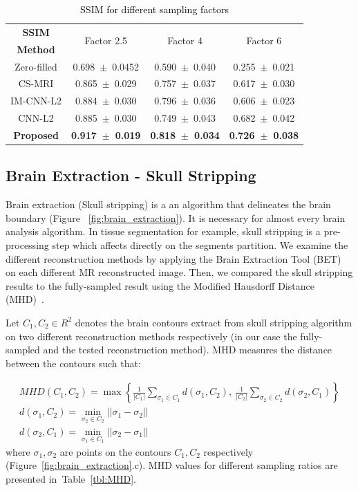 \documentclass[review]{elsarticle}
\begin{document}
\begin{table}[H]
	\centering{}
	\begin{tabular}{|c||c||c||c|}
		\hline 
		\textbf{SSIM} & \multicolumn{1}{c||}{\multirow{2}{*}{Factor 2.5}} & \multicolumn{1}{c||}{\multirow{2}{*}{Factor 4}} & \multicolumn{1}{c|}{\multirow{2}{*}{Factor 6}} \tabularnewline
		\textbf{Method} & \multicolumn{1}{c||}{} & \multicolumn{1}{c||}{} & \multicolumn{1}{c|}{} \tabularnewline \cline{1-4}
		
		Zero-filled         &0.698~$\pm$~0.0452  &0.590~$\pm$~0.040   &0.255~$\pm$~0.021\tabularnewline
		CS-MRI              &0.865~$\pm$~0.029  &0.757~$\pm$~0.037   &0.617~$\pm$~0.030\tabularnewline
		IM-CNN-L2           &0.884~$\pm$~0.030  &0.796~$\pm$~0.036   &0.606~$\pm$~0.023\tabularnewline
		CNN-L2              &0.885~$\pm$~0.030  &0.749~$\pm$~0.043   &0.682~$\pm$~0.042\tabularnewline
		\textbf{Proposed}   &\textbf{0.917~$\pm$~0.019}  &\textbf{0.818~$\pm$~0.034}   &\textbf{0.726~$\pm$~0.038}\tabularnewline
		\hline 
	\end{tabular}\caption{\textcolor{black}{\footnotesize{}{}SSIM for different sampling factors}{\footnotesize{}\label{tbl:SSIM_NO_MASK}}}
\end{table}


\subsection{Brain Extraction - Skull Stripping}
Brain extraction (Skull stripping) is a an algorithm that delineates the brain boundary (Figure~ \ref{fig:brain_extraction}). It is necessary for almost every brain analysis algorithm. In tissue segmentation for example, skull stripping is a pre-processing step which affects directly on the segments partition. We examine the different reconstruction methods by applying the Brain Extraction Tool (BET) \cite{smith2002fast} on each different MR reconstructed image. Then, we compared the skull stripping results to the fully-sampled result using the Modified Hausdorff Distance (MHD)~\cite{dubuisson1994modified}.

Let $C_1,C_2\in R^2$ denotes the brain contours extract from skull stripping algorithm on two different reconstruction methods respectively (in our case the fully-sampled and the tested reconstruction method). MHD measures the distance between the contours such that:

\begin{equation}
\begin{array}{cc}
MHD(C_1,C_2) = \max \left\{\frac{1}{|C_1|} \sum_{\sigma_{1}\in C_1}^{}d(\sigma_1,C_2), ~ \frac{1}{|C_2|} \sum_{\sigma_{2}\in C_2}^{}d(\sigma_2,C_1)\right\} \\
d(\sigma_1,C_2) = \underset{\sigma_{2}\in C_{2}}{\min}||\sigma_1-\sigma_2|| \\
d(\sigma_2,C_1) = \underset{\sigma_{1}\in C_{1}}{\min}||\sigma_2-\sigma_1||
\end{array}
\end{equation}
where $\sigma_1,\sigma_2$ are points on the contours $C_1,C_2$ respectively (Figure~\ref{fig:brain_extraction}.c). MHD values for different sampling ratios are presented in~Table~\ref{tbl:MHD}.
\end{document}
